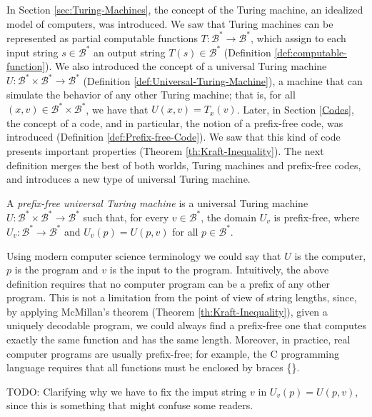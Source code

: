 In Section \ref{sec:Turing-Machines}, the concept of the Turing machine, an idealized model of computers, was introduced. We saw that Turing machines can be represented as partial computable functions $T:\mathcal{B}^\ast \rightarrow \mathcal{B}^\ast$, which assign to each input string $s \in \mathcal{B}^\ast$ an output string $T(s) \in \mathcal{B}^\ast$ (Definition \ref{def:computable-function}). We also introduced the concept of a universal Turing machine $U:\mathcal{B}^\ast \times \mathcal{B}^\ast \rightarrow \mathcal{B}^\ast$ (Definition \ref{def:Universal-Turing-Machine}), a machine that can simulate the behavior of any other Turing machine; that is, for all $(x,v) \in  \mathcal{B}^\ast \times \mathcal{B}^\ast$, we have that $U(x,v) = T_{x}(v)$. Later, in Section \ref{Codes}, the concept of a code, and in particular, the notion of a prefix-free code, was introduced (Definition \ref{def:Prefix-free-Code}). We saw that this kind of code presents important properties (Theorem \ref{th:Kraft-Inequality}). The next definition merges the best of both worlds, Turing machines and prefix-free codes, and introduces a new type of universal Turing machine.

\begin{definition}
A \emph{prefix-free universal Turing machine} is a universal Turing machine $U:\mathcal{B}^\ast \times \mathcal{B}^\ast \rightarrow \mathcal{B}^\ast$ such that, for every $v \in \mathcal{B}^\ast$, the domain $U_{v}$ is prefix-free, where $U_{v}:\mathcal{B}^\ast \rightarrow \mathcal{B}^\ast$ and $U_{v}(p) = U(p, v)$ for all $p \in \mathcal{B}^\ast$.
\end{definition}

Using modern computer science terminology we could say that $U$ is the computer, $p$ is the program and $v$ is the input to the program. Intuitively, the above definition requires that no computer program can be a prefix of any other program. This is not a limitation from the point of view of string lengths, since, by applying McMillan's theorem (Theorem \ref{th:Kraft-Inequality}), given a uniquely decodable program, we could always find a prefix-free one that computes exactly the same function and has the same length. Moreover, in practice, real computer programs are usually prefix-free; for example, the C programming language requires that all functions must be enclosed by braces \{\}.

{\color{red} TODO: Clarifying why we have to fix the imput string  $v$ in $U_{v}(p) = U(p, v)$, since this is something that might confuse some readers.}

